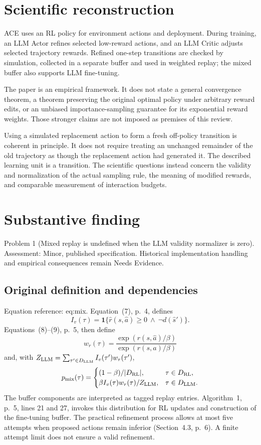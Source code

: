 \documentclass[10pt]{article}
\begin{document}
\section*{Scientific reconstruction}
ACE uses an RL policy for environment actions and deployment. During training, an LLM Actor refines selected low-reward actions, and an LLM Critic adjusts selected trajectory rewards. Refined one-step transitions are checked by simulation, collected in a separate buffer and used in weighted replay; the mixed buffer also supports LLM fine-tuning.\par
The paper is an empirical framework. It does not state a general convergence theorem, a theorem preserving the original optimal policy under arbitrary reward edits, or an unbiased importance-sampling guarantee for its exponential reward weights. Those stronger claims are not imposed as premises of this review.\par
Using a simulated replacement action to form a fresh off-policy transition is coherent in principle. It does not require treating an unchanged remainder of the old trajectory as though the replacement action had generated it. The described learning unit is a transition. The scientific questions instead concern the validity and normalization of the actual sampling rule, the meaning of modified rewards, and comparable measurement of interaction budgets.\par
\section*{Substantive finding}
Problem 1 (Mixed replay is undefined when the LLM validity normalizer is zero).  Assessment: Minor, published specification. Historical implementation handling and empirical consequences remain Needs Evidence.\par
\subsection*{Original definition and dependencies}
Equation reference: eq:mix. Equation (7), p. 4, defines \[I_v(\tau)=\mathbf1\{\widehat r(s,\widehat a)\ge0
                  \ \land\ \neg d(\widehat s')\}.\] Equations (8)–(9), p. 5, then define \[w_r(\tau)=
 \frac{\exp(\widehat r(s,\widehat a)/\beta)}
      {\exp(r(s,a)/\beta)}\] and, with \(Z_{\rm LLM}=\sum_{\tau'\in D_{\rm LLM}}I_v(\tau')w_r(\tau')\), \[
 p_{\rm mix}(\tau)=
 \begin{cases}
 (1-\beta)/|D_{\rm RL}|,&\tau\in D_{\rm RL},\\
 \beta I_v(\tau)w_r(\tau)/Z_{\rm LLM},&
                          \tau\in D_{\rm LLM}.
 \end{cases}\] The buffer components are interpreted as tagged replay entries. Algorithm 1, p. 5, lines 21 and 27, invokes this distribution for RL updates and construction of the fine-tuning buffer. The practical refinement process allows at most five attempts when proposed actions remain inferior (Section 4.3, p. 6). A finite attempt limit does not ensure a valid refinement.\par
\end{document}
